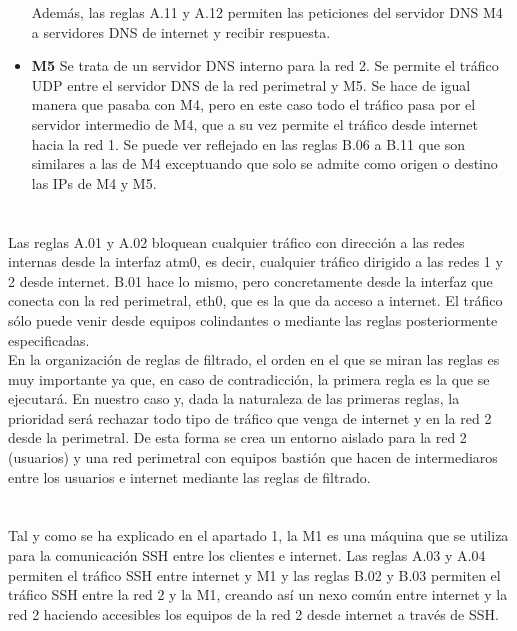 \documentclass[10pt,a4paper]{article}
\begin{document}
\begin{itemize}
Además, las reglas A.11 y A.12 permiten las peticiones del servidor DNS M4 a servidores DNS de internet y recibir respuesta.
\item \textbf{M5} Se trata de un servidor DNS interno para la red 2. Se permite el tráfico UDP entre el servidor DNS de la red perimetral y M5. Se hace de igual manera que pasaba con M4, pero en este caso todo el tráfico pasa por el servidor intermedio de M4, que a su vez permite el tráfico desde internet hacia la red 1. Se puede ver reflejado en las reglas B.06 a B.11 que son similares a las de M4 exceptuando que solo se admite como origen o destino las IPs de M4 y M5.
\end{itemize}

\section{}
Las reglas A.01 y A.02 bloquean cualquier tráfico con dirección a las redes internas desde la interfaz atm0, es decir,  cualquier tráfico dirigido a las redes 1 y 2 desde internet. B.01 hace lo mismo, pero concretamente desde la interfaz que conecta con la red perimetral, eth0, que es la que da acceso a internet. El tráfico sólo puede venir desde equipos colindantes o mediante las reglas posteriormente especificadas.\\
En la organización de reglas de filtrado, el orden en el que se miran las reglas es muy importante ya que, en caso de contradicción, la primera regla es la que se ejecutará. En nuestro caso y, dada la naturaleza de las primeras reglas, la prioridad será rechazar todo tipo de tráfico que venga de internet y en la red 2 desde la perimetral. De esta forma se crea un entorno aislado para la red 2 (usuarios) y una red perimetral con equipos bastión que hacen de intermediaros entre los usuarios e internet mediante las reglas de filtrado.
\section{}
Tal y como se ha explicado en el apartado 1, la M1 es una máquina que se utiliza para la comunicación SSH entre los clientes e internet. Las reglas A.03 y A.04 permiten el tráfico SSH entre internet y M1 y las reglas B.02 y B.03 permiten el tráfico SSH entre la red 2 y la M1, creando así un nexo común entre internet y la red 2 haciendo accesibles los equipos de la red 2 desde internet a través de SSH.
\end{document}
